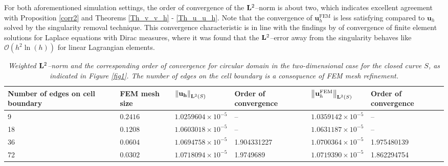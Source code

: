 \documentclass[pdflatex,sn-mathphys-num]{sn-jnl}
\newtheorem*{lemma star}{Lemma}
\begin{document}
For both aforementioned simulation settings, the order of convergence of the ${\bf L}^2$--norm is about two, which indicates excellent agreement with Proposition \ref{corr2} and Theorems \ref{Th_v_v_h} - \ref{Th_u_u_h}. Note that the convergence of $\boldsymbol{u}_h^{\mathrm{FEM}}$ is less satisfying compared to $\boldsymbol{u}_h$ solved by the singularity removal technique. This convergence characteristic is in line with the findings by \cite{K_ppl_2014} of convergence of finite element solutions for Laplace equations with Dirac measures, where it was found that the ${\bf L}^2$--error away from the singularity behaves like $\mathcal{O}(h^2 \ln(h))$ for linear Lagrangian elements.

\begin{table}[h!]\footnotesize
\centering
\caption{\it Weighted ${\bf L}^2$--norm and the corresponding order of convergence for circular domain in the two-dimensional case for the closed curve $S$, as indicated in Figure \ref{fig1}. The number of edges on the cell boundary is a consequence of FEM mesh refinement.}
\label{tab:boundary_edge_results}
\begin{tabular}{m{1.5cm}m{1cm}|m{2.5cm}m{1.5cm}||m{2.5cm}m{1.5cm}}
\hline
\textbf{Number of edges on cell boundary} & \textbf{FEM mesh size} & \textbf{$\left\Vert \mathbf{u_h}%
\right\Vert _{{\bf L}^{2}(S)}$} & \textbf{Order of convergence} & \textbf{$\left\Vert \mathbf{u}%
_h^{\mathrm{FEM}}\right\Vert _{{\bf L}^{2}(S)}$} & \textbf{Order of convergence} \\
\hline
9   & $0.2416$ &$1.0259604 \times 10^{-5}$ & --             & $1.0359142 \times 10^{-5}$ & --             \\
18  & $0.1208$ & $1.0603018 \times 10^{-5}$ & --             & $1.0631187 \times 10^{-5}$ & --             \\
36  & $0.0604$ &$1.0694758 \times 10^{-5}$ & 1.904331227    & $1.0700364 \times 10^{-5}$ & 1.975480139    \\
72  & $0.0302$   & $1.0718094 \times 10^{-5}$ & 1.9749689      & $1.0719390 \times 10^{-5}$ & 1.862294754    \\
\hline
\hline
\end{tabular}


\end{table}
\end{document}
